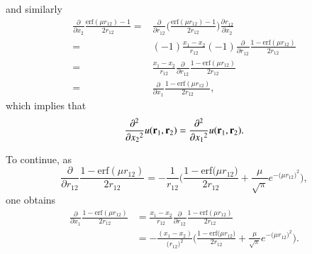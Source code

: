 \documentclass[aip,jcp,reprint,noshowkeys,superscriptaddress]{revtex4-1}
\newcommand{\deriv}[3]{\frac{\partial^{#3} #1}{\partial {#2}^{#3}}}
\newcommand{\br}[0]{{\bf {r}}}
\begin{document}
and similarly
\begin{equation}
 \label{eq:d2_x2_1}
 \begin{aligned}
 \deriv{}{x_2}{} \frac{\text{erf}(\mu r_{12}) -  1}{2 r_{12}}  = &\deriv{}{r_{12}}{}\bigg( \frac{\text{erf}(\mu r_{12}) - 1}{2 r_{12}}\bigg) \deriv{r_{12}}{x_2}{} \\
              = & (-1) \frac{x_1 - x_2}{r_{12}} (-1)  \deriv{}{r_{12}}{} \frac{1 - \text{erf}(\mu r_{12})}{2 r_{12}} \\
              = & \frac{x_1 - x_2}{r_{12}} \deriv{}{r_{12}}{} \frac{1 - \text{erf}(\mu r_{12})}{2 r_{12}} \\
              = & \deriv{}{x_1}{} \frac{1 - \text{erf}(\mu r_{12})}{2 r_{12}},
 \end{aligned}
\end{equation}
which implies that 
\begin{equation}
  \label{eq:d2_x2_2}
 \deriv{}{x_{2}}{2}  u(\br{}_1,\br{}_2) = \deriv{}{x_{1}}{2}  u(\br{}_1,\br{}_2).
\end{equation}

To continue, as 
\begin{equation}
 \deriv{}{r_{12}}{} \frac{1 - \text{erf}(\mu r_{12})}{2 r_{12}} = -\frac{1}{r_{12}}\bigg(\frac{1 - \text{erf}\big( \mu r_{12} \big)}{2 r_{12}}  + \frac{\mu}{\sqrt{\pi}} e^{-\big(\mu r_{12} \big)^2} \bigg), 
\end{equation}
one obtains 
\begin{equation}
 \label{eq:d2_x1_2}
 \begin{aligned}
 \deriv{}{x_1}{} \frac{1 - \text{erf}(\mu r_{12})}{2 r_{12}} & = \frac{x_1 - x_2}{r_{12}} \deriv{}{r_{12}}{} \frac{1 - \text{erf}(\mu r_{12})}{2 r_{12}} \\
 & =  -\frac{(x_1 - x_2)}{\big( r_{12} \big)^2}\bigg(\frac{1 - \text{erf}\big( \mu r_{12} \big)}{2 r_{12}}  + \frac{\mu}{\sqrt{\pi}} e^{-\big(\mu r_{12} \big)^2} \bigg). 
 \end{aligned}
\end{equation}
\end{document}
